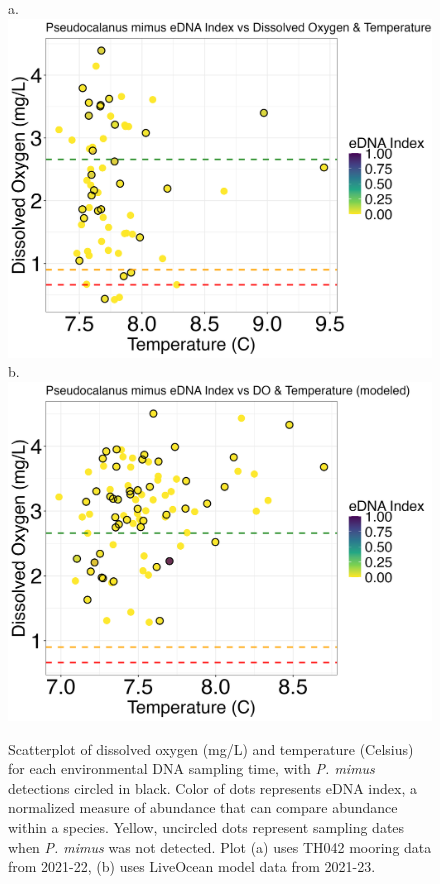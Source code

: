 \documentclass[12pt,twoside]{reedthesis}
\begin{document}
	\begin{figure}[!h]
		\begin{center}
			a. \includegraphics[scale=0.3]{Pmimus_Scatter_noOut}
			b. \includegraphics[scale=0.3]{Pmimus_Scatter_AllYr_mod_noOut}
			\caption[\textit{P. mimus} scatterplot]{\footnotesize{Scatterplot of dissolved oxygen (mg/L) and temperature (Celsius) for each environmental DNA sampling time, with \textit{P. mimus} detections circled in black. Color of dots represents eDNA index, a normalized measure of abundance that can compare abundance within a species. Yellow, uncircled dots represent sampling dates when \textit{P. mimus} was not detected. Plot (a) uses TH042 mooring data from 2021-22, (b) uses LiveOcean model data from 2021-23.}} %
			\label{PmimusScatter}
			\end{center}
	\end{figure} 
	
\end{document}
